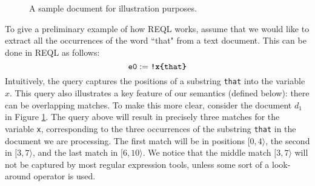 \begin{figure}
	\vspace*{-7mm}
	\begin{center}
	\end{center}
	\vspace*{-7mm}
	\caption{A sample document for illustration purposes.}
	\label{fig-doc}
\end{figure}



\begin{example}\label{example:basic}
To give a preliminary example of how REQL works, assume that we would like to
extract all the occurrences of the word ``that" from a text document. This can be done in REQL as follows:
$$
\texttt{e0} := \texttt{\textbf{!x\{}that\textbf{\}}}
$$
Intuitively, the query captures the positions of a substring \texttt{that}
into the variable $x$. This query also illustrates a key feature of
our semantics (defined below): there can be overlapping matches. To make this more clear,
consider the document $d_1$ in Figure \ref{fig-doc}. The query above will result
in precisely three matches for the variable \texttt{x}, corresponding to the
three occurrences of the substring \texttt{that} in the document we are
processing. The first match will be in positions $[0,4\rangle$, the second in
$[3,7\rangle$, and the last match in $[6,10\rangle$. We notice that the middle
match $[3,7\rangle$ will not be captured by most regular expression tools,
unless some sort of a look-around operator is used.
\end{example}

